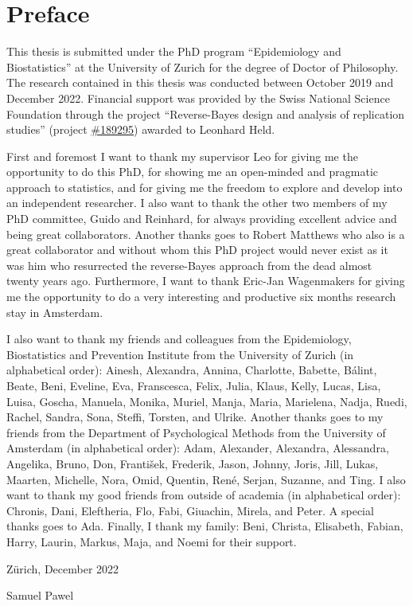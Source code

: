 \section*{Preface}

This thesis is submitted under the PhD program ``Epidemiology and
Biostatistics'' at the University of Zurich for the degree of Doctor of
Philosophy.
The research contained in this thesis was conducted between October 2019 and
December 2022. Financial support was provided by the Swiss National Science
Foundation through the project ``Reverse-Bayes design and analysis of
replication studies'' (project
\href{https://data.snf.ch/grants/grant/189295}{\#189295}) awarded to Leonhard
Held.

First and foremost I want to thank my supervisor Leo for giving me the
opportunity to do this PhD, for showing me an open-minded and pragmatic approach
to statistics, and for giving me the freedom to explore and develop into an
independent researcher. I also want to thank the other two members of my PhD
committee, Guido and Reinhard, for always providing excellent advice and being
great collaborators. Another thanks goes to Robert Matthews who also is a great
collaborator and without whom this PhD project would never exist as it was him
who resurrected the reverse-Bayes approach from the dead almost twenty years
ago. Furthermore, I want to thank Eric-Jan Wagenmakers for giving me the
opportunity to do a very interesting and productive six months research stay in
Amsterdam.

I also want to thank my friends and colleagues from the Epidemiology,
Biostatistics and Prevention Institute from the University of Zurich (in
alphabetical order): Ainesh, Alexandra, Annina, Charlotte, Babette, Bálint,
Beate, Beni, Eveline, Eva, Franscesca, Felix, Julia, Klaus, Kelly, Lucas, Lisa,
Luisa, Goscha, Manuela, Monika, Muriel, Manja, Maria, Marielena, Nadja, Ruedi,
Rachel, Sandra, Sona, Steffi, Torsten, and Ulrike. Another thanks goes to my
friends from the Department of Psychological Methods from the University of
Amsterdam (in alphabetical order): Adam, Alexander, Alexandra, Alessandra,
Angelika, Bruno, Don, František, Frederik, Jason, Johnny, Joris, Jill, Lukas,
Maarten, Michelle, Nora, Omid, Quentin, René, Serjan, Suzanne, and Ting. I also
want to thank my good friends from outside of academia (in alphabetical order):
Chronis, Dani, Eleftheria, Flo, Fabi, Giuachin, Mirela, and Peter. A special
thanks goes to Ada. Finally, I thank my family: Beni, Christa, Elisabeth,
Fabian, Harry, Laurin, Markus, Maja, and Noemi for their support.

\begin{flushright}
  \hfill Zürich, December 2022

  \hfill Samuel Pawel
\end{flushright}

